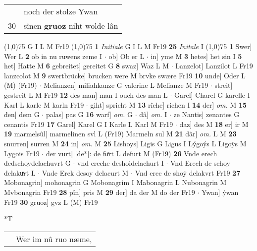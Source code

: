 \documentclass[8pt,a4paper,notitlepage]{article}
\begin{document}
\begin{table}[ht]
\begin{minipage}[t]{0.5\linewidth}
\begin{tabular}{rl}
 & noch der stolze Ywan\\ 
30 & sînen \textbf{gruoz} niht wolde lân\\ 
\end{tabular}
\scriptsize
\line(1,0){75} \newline
G I L M Fr19 \newline
\line(1,0){75} \newline
\textbf{1} \textit{Initiale} G I L M Fr19  \textbf{25} \textit{Initale} I  \newline
\line(1,0){75} \newline
\textbf{1} Swer] Wer L \textbf{2} ob in nu ruwens zeme I  $\cdot$ ob] Ob er L  $\cdot$ in] yme M \textbf{3} hetes] het sin I \textbf{5} het] Hatte M \textbf{6} gebreitet] gereitet G \textbf{8} swaz] Waz L M  $\cdot$ Lanzelot] Lanzilot L Fr19 lanzcolot M \textbf{9} swertbrücke] brucken were M brvke swære Fr19 \textbf{10} unde] Oder L (M) (Fr19)  $\cdot$ Melianzen] miliahkanze G valerine L Melianze M Fr19  $\cdot$ streit] gestreit L M Fr19 \textbf{12} des man] man I ouch des man L  $\cdot$ Garel] Charel G karelle I Karl L karle M karln Fr19  $\cdot$ giht] spricht M \textbf{13} rîche] richen I \textbf{14} der] \textit{om.} M \textbf{15} den] dem G  $\cdot$ palas] pas G \textbf{16} warf] \textit{om.} G  $\cdot$ dâ] \textit{om.} I  $\cdot$ ze Nantis] zenantes G cenantis Fr19 \textbf{17} Garel] Karel G I Karle L Karl M Fr19  $\cdot$ daz] des M \textbf{18} er] ir M \textbf{19} marmelsûl] marmelinen svl L (Fr19) Marmeln sul M \textbf{21} dâr] \textit{om.} L M \textbf{23} snurren] surren M \textbf{24} in] \textit{om.} M \textbf{25} Lishoys] Ligis G Ligus I Lýgoýs L Ligoÿs M Lygois Fr19  $\cdot$ der vurt] [de*]: de fuͯrt L defurt M (Fr19) \textbf{26} Vnde erech dedschoydelachuvrt G  $\cdot$ vnd ereche deshoidelachurt I  $\cdot$ Vnd Erech de schoy delakuͯrt L  $\cdot$ Vnde Erek desoy delacurt M  $\cdot$ Vnd erec de shoẏ delakvrt Fr19 \textbf{27} Mobonagrin] mohonagrin G Mobonagrim I Mabonagrin L Nubonagrin M Mvbonagrin Fr19 \textbf{28} pîn] pris M \textbf{29} der] da der M do der Fr19  $\cdot$ Ywan] ẏwan Fr19 \textbf{30} gruoz] gvz L (M) Fr19 \newline
\end{minipage}
\hspace{0.5cm}
\begin{minipage}[t]{0.5\linewidth}
\small
\begin{center}*T
\end{center}
\begin{tabular}{rl}
 & Wer im nû ruo næme,\\ 

\end{tabular}
\end{minipage}
\end{table}
\end{document}
